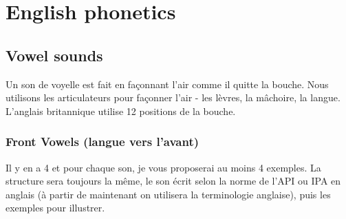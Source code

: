 \documentclass[12pt,a4paper]{book}
\begin{document}
 
 
         
        
        
        


\part{\textenglish{English phonetics}}
\chapter{\textenglish{Vowel sounds}}
\label{chap:vow}
Un son de voyelle est fait en façonnant l'air comme il quitte la
bouche. Nous utilisons les articulateurs pour façonner l'air - les
lèvres, la mâchoire, la langue. L'anglais britannique utilise 12 positions de la bouche.
\section{\textenglish{Front Vowels} (langue vers l'avant)}
\label{sec:orge433061}
Il y en a 4 et pour chaque son, je vous proposerai au moins 4
exemples. La structure sera toujours la même, le son écrit selon la
norme de l'API ou IPA en anglais (à partir de maintenant on utilisera
la terminologie anglaise), puis les exemples pour illustrer.
\end{document}
